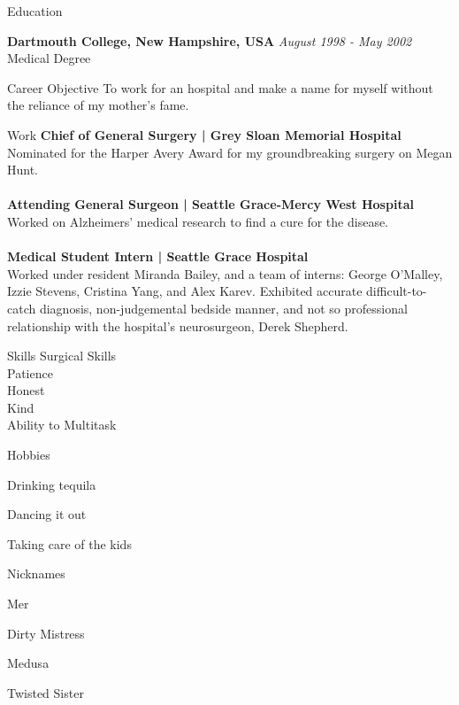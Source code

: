 \documentclass{resume} %
\begin{document}

\begin{rSection}{Education}

{\bf Dartmouth College, New Hampshire, USA} \hfill {\em August 1998 - May 2002} 
\\ Medical Degree

\end{rSection}

\begin{rSection}{Career Objective}
 To work for an hospital and make a name for myself without the reliance of my mother's fame.
\end{rSection}
\begin{rSection}{Work}
{\bf Chief of General Surgery | Grey Sloan Memorial Hospital}
\\Nominated for the Harper Avery Award for my groundbreaking surgery on Megan Hunt.\\
\\{\bf Attending General Surgeon | Seattle Grace-Mercy West Hospital }\\
Worked on Alzheimers' medical research to find a cure for the disease. \\
\\{\bf Medical Student Intern | Seattle Grace Hospital}\\
Worked under resident Miranda Bailey, and a team of interns: George O'Malley, Izzie Stevens, Cristina Yang, and Alex Karev. Exhibited accurate difficult-to-catch diagnosis, non-judgemental bedside manner, and not so professional relationship with the hospital's neurosurgeon, Derek Shepherd. 
\end{rSection}


\begin{rSection}{Skills} 
Surgical Skills \\
Patience \\
Honest \\
Kind \\
Ability to Multitask
\end{rSection}


\begin{rSection}{Hobbies}
\item Drinking tequila
\item Dancing it out
\item Taking care of the kids 
\end{rSection}

\begin{rSection}{Nicknames}
\item Mer
\item Dirty Mistress
\item Medusa
\item Twisted Sister
\end{rSection}
\end{document}
